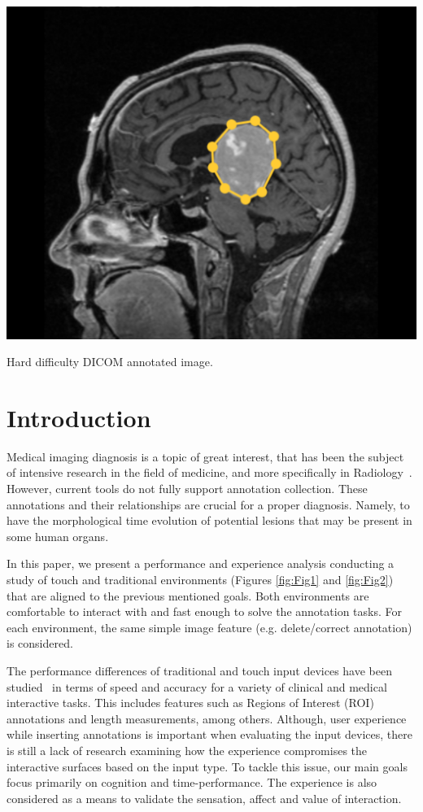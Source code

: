 \documentclass[sigchi-a, authorversion]{acmart}
\begin{document}
\begin{marginfigure}
\includegraphics[width=\marginparwidth]{screen3.png}
\caption{Hard difficulty DICOM annotated image.}
\label{fig:Fig5}
\end{marginfigure}

\section{Introduction}

Medical imaging diagnosis is a topic of great interest, that has been the subject of intensive research in the field of medicine, and more specifically in Radiology~\cite{doi2007computer, seibel2005medical, doi2005current}. However, current tools do not fully support annotation collection. These annotations and their relationships are crucial for a proper diagnosis. Namely, to have the morphological time evolution of potential lesions that may be present in some human organs.

In this paper, we present a performance and experience analysis conducting a study of touch and traditional environments (Figures \ref{fig:Fig1} and \ref{fig:Fig2}) that are aligned to the previous mentioned goals. Both environments are  comfortable to interact with and fast enough to solve the annotation tasks. For each environment, the same simple image feature (e.g. delete/correct annotation) is considered.

The performance differences of traditional and touch input devices have been studied~\cite{watson2013deconstructing} in terms of speed and accuracy for a variety of clinical and medical interactive tasks. This includes features such as Regions of Interest (ROI) annotations and length measurements, among others. Although, user experience while inserting annotations is important when evaluating the input devices, there is still a lack of research examining how the experience compromises the interactive surfaces based on the input type. To tackle this issue, our main goals focus primarily on cognition and time-performance. The experience is also considered as a means to validate the sensation, affect and value of  interaction.
\end{document}
